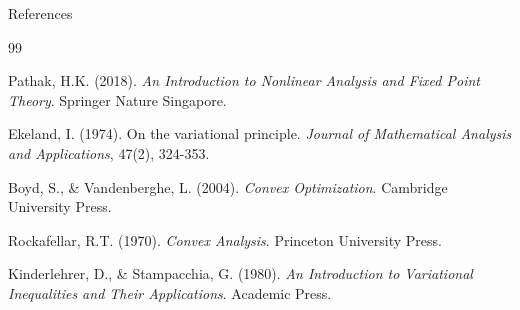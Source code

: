 \documentclass[aspectratio=169,10pt]{beamer}
\begin{document}
\begin{frame}[allowframebreaks]{References}
  \begin{thebibliography}{99}

     Pathak, H.K. (2018). \textit{An Introduction to Nonlinear Analysis and Fixed Point Theory}. Springer Nature Singapore.

     Ekeland, I. (1974). On the variational principle. \textit{Journal of Mathematical Analysis and Applications}, 47(2), 324-353.

     Boyd, S., \& Vandenberghe, L. (2004). \textit{Convex Optimization}. Cambridge University Press.

     Rockafellar, R.T. (1970). \textit{Convex Analysis}. Princeton University Press.

     Kinderlehrer, D., \& Stampacchia, G. (1980). \textit{An Introduction to Variational Inequalities and Their Applications}. Academic Press.

  \end{thebibliography}
\end{frame}
\end{document}
